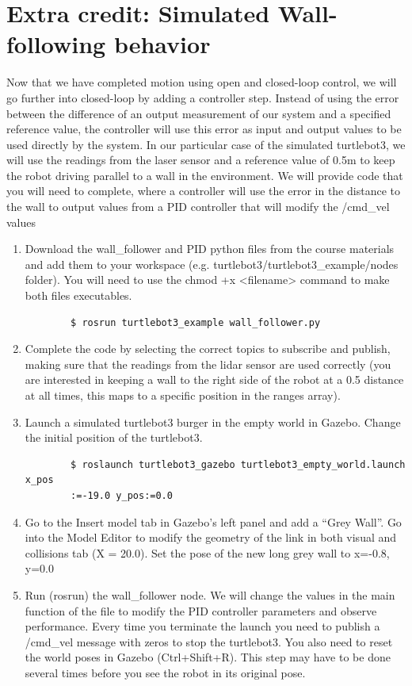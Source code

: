 \documentclass[12pt]{article}
\begin{document}
\section{Extra credit: Simulated Wall-following behavior}
Now that we have completed motion using open and closed-loop control, we will go further into closed-loop by adding a controller step. Instead of using the error between the difference of an output measurement of our system and a specified reference value, the controller will use this error as input and output values to be used directly by the system. In our particular case of the simulated turtlebot3, we will use the readings from the laser sensor and a reference value of 0.5m to keep the robot driving parallel to a wall in the environment. 
We will provide code that you will need to complete, where a controller will use the error in the distance to the wall to output values from a PID controller that will modify the /cmd\_vel values

\begin{enumerate}
    \item Download the wall\_follower and PID python files from the course materials and add them to your workspace (e.g. turtlebot3/turtlebot3\_example/nodes folder). You will need to use the chmod +x <filename> command to make both files executables.
    \begin{verbatim}
        $ rosrun turtlebot3_example wall_follower.py
    \end{verbatim}
    
    \item Complete the code by selecting the correct topics to subscribe and publish, making sure that the readings from the lidar sensor are used correctly (you are interested in keeping a wall to the right side of the robot at a 0.5 distance at all times, this maps to a specific position in the ranges array).
    
    \item Launch a simulated turtlebot3 burger in the empty world in Gazebo. Change the initial position of the turtlebot3.
    \begin{verbatim}
        $ roslaunch turtlebot3_gazebo turtlebot3_empty_world.launch x_pos
        :=-19.0 y_pos:=0.0
    \end{verbatim}
    
    \item Go to the Insert model tab in Gazebo’s left panel and add a “Grey Wall”. Go into the Model Editor to modify the geometry of the link in both visual and collisions tab (X = 20.0). Set the pose of the new long grey wall to x=-0.8, y=0.0
    
    \item Run (rosrun) the wall\_follower node. We will change the values in the main function of the file to modify the PID controller parameters and observe performance. Every time you terminate the launch you need to publish a /cmd\_vel message with zeros to stop the turtlebot3. You also need to reset the world poses in Gazebo (Ctrl+Shift+R). This step may have to be done several times before you see the robot in its original pose.
    
    
\end{enumerate}
\end{document}
